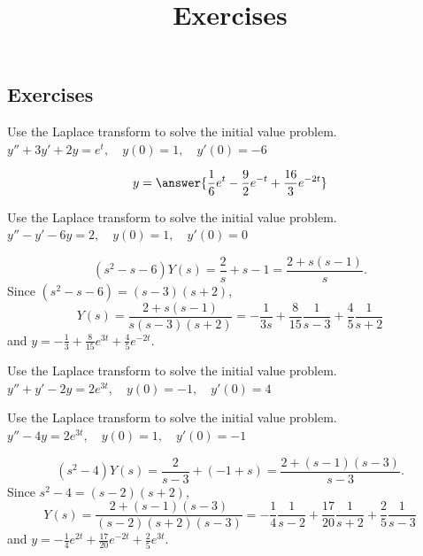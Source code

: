 \documentclass{ximera}
\title{Exercises} \license{CC BY-NC-SA 4.0}
\begin{document}
\begin{abstract}
\end{abstract}
\maketitle

\begin{onlineOnly}
\section*{Exercises}
\end{onlineOnly}



\begin{problem}\label{exer:8.3.1} Use the Laplace transform to solve the initial value problem. $y''+3y'+2y=e^t, \quad  y(0)=1,\quad y'(0)=-6$

$$y=\answer{\frac{1}{6}e^t-\frac{9}{2}e^{-t}+\frac{16}{3}e^{-2t}}$$

\end{problem}

\begin{problem}\label{exer:8.3.2} Use the Laplace transform to solve the initial value problem. $y''-y'-6y=2, \quad  y(0)=1,\quad y'(0)=0$

\begin{solution}
$$
(s^2-s-6)Y(s)=\frac{2}{s}+s-1=\frac{2+s(s-1)}{s}.
$$
Since $(s^2-s-6)=(s-3)(s+2)$,
$$
Y(s)=\frac{2+s(s-1)}{s(s-3)(s+2)}
=-\frac{1}{3s}+\frac{8}{15}\frac{1}{s-3}+\frac{4}{5}\frac{1}{s+2}
$$
and $y=-\frac{1}{3}+\frac{8}{15}e^{3t}+\frac{4}{5}e^{-2t}$.
\end{solution}
\end{problem}

\begin{problem}\label{exer:8.3.3} Use the Laplace transform to solve the initial value problem. $y''+y'-2y=2e^{3t}, \quad  y(0)=-1,\quad y'(0)=4$
\end{problem}

\begin{problem}\label{exer:8.3.4} Use the Laplace transform to solve the initial value problem. $y''-4y=2 e^{3t}, \quad  y(0)=1,\quad y'(0)=-1$

\begin{solution}
$$
(s^2-4)Y(s)=\frac{2}{s-3}+(-1+s)=\frac{2+(s-1)(s-3)}{s-3}.
$$
Since $s^2-4=(s-2)(s+2)$,
$$
Y(s)=\frac{2+(s-1)(s-3)}{(s-2)(s+2)(s-3)}=
-\frac{1}{4}\frac{1}{s-2}+\frac{17}{20}\frac{1}{s+2}+\frac{2}{5}\frac{1}{s-3}
$$
and   $y=-\frac{1}{4}e^{2t}+\frac{17}{20}e^{-2t}+\frac{2}{5}e^{3t}$.
\end{solution}
\end{problem}
\end{document}
